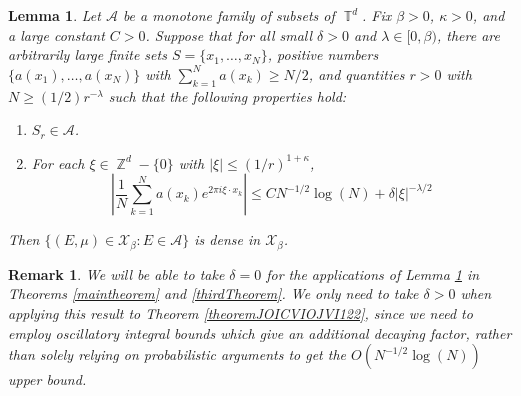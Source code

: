\documentclass[dvipsnames,letterpaper,12pt]{article}
\numberwithin{equation}{section}
\DeclareMathOperator{\ZZ}{\mathbb{Z}}
\DeclareMathOperator{\TT}{\mathbb{T}}
\newtheorem{lemma}[theorem]{Lemma}
\newtheorem{remark}[theorem]{Remark}
\numberwithin{theorem}{section}
\begin{document}
\begin{lemma} \label{LemmaFIOAJFOIWJ}
    Let $\mathcal{A}$ be a monotone family of subsets of $\TT^d$. Fix $\beta > 0$, $\kappa > 0$, and a large constant $C > 0$. Suppose that for all small $\delta > 0$ and $\lambda \in [0,\beta)$, there are arbitrarily large finite sets $S = \{ x_1,\dots,x_N \}$, positive numbers $\{ a(x_1), \dots, a(x_N) \}$ with $\sum_{k = 1}^N a(x_k) \geq N/2$, and quantities $r > 0$ with $N \geq (1/2) r^{-\lambda}$ such that the following properties hold:
    \begin{enumerate}
        \item[(1)] $S_r \in \mathcal{A}$.
        \item[(2)] For each $\xi \in \ZZ^d - \{ 0 \}$ with $|\xi| \leq (1/r)^{1 + \kappa}$,
        \[ \left| \frac{1}{N} \sum_{k = 1}^N a(x_k) e^{2 \pi i \xi \cdot x_k} \right| \leq C N^{-1/2} \log(N) + \delta |\xi|^{-\lambda/2} \]
    \end{enumerate}
    Then $\{ (E,\mu) \in \mathcal{X}_\beta : E \in \mathcal{A} \}$ is dense in $\mathcal{X}_\beta$.
\end{lemma}

\begin{remark}
    We will be able to take $\delta = 0$ for the applications of Lemma \ref{LemmaFIOAJFOIWJ} in Theorems \ref{maintheorem} and \ref{thirdTheorem}. We only need to take $\delta > 0$ when applying this result to Theorem \ref{theoremJOICVIOJVI122}, since we need to employ oscillatory integral bounds which give an additional decaying factor, rather than solely relying on probabilistic arguments to get the $O(N^{-1/2} \log(N))$ upper bound.
\end{remark}




%
%
\end{document}
